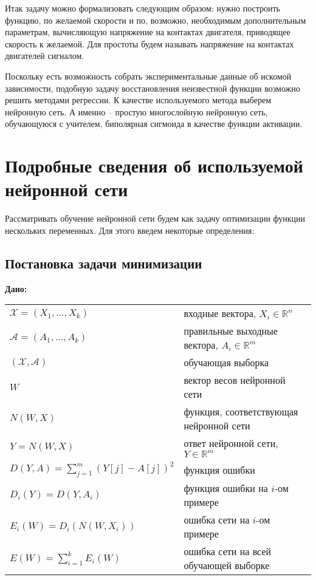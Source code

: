\documentclass[14pt]{extreport}
\begin{document}
        Итак задачу можно формализовать следующим образом: нужно построить функцию, по желаемой скорости и по, возможно, необходимым дополнительным параметрам, вычисляющую напряжение на контактах двигателя, приводящее скорость к желаемой. Для простоты будем называть напряжение на контактах двигателей сигналом.

        Поскольку есть возможность собрать экспериментальные данные об искомой зависимости, подобную задачу восстановления неизвестной функции возможно решить методами регрессии. К качестве используемого метода выберем нейронную сеть. А именно -- простую многослойную нейронную сеть, обучающуюся с учителем, биполярная сигмоида в качестве функции активации.
\newpage
    \chapter{Подробные сведения об используемой нейронной сети}

    Рассматривать обучение нейронной сети будем как задачу оптимизации функции нескольких переменных. Для этого введем некоторые определения:

    \section{Постановка задачи минимизации}

        {\bf 
            Дано:
        }

        \begin{tabular}{p{6cm} p{7.5cm}}
             $\mathcal{X}=(X_1,\ldots,X_k)$ & входные вектора, $X_i\in\mathbb{R}^n$\\[0.1cm]
             $\mathcal{A}=(A_1,\ldots,A_k)$ & правильные выходные вектора, $A_i\in\mathbb{R}^m$\\[0.1cm]
             $(\mathcal{X},\mathcal{A})$ & обучающая выборка  \\[0.1cm]
             $W$ & вектор весов нейронной сети \\[0.1cm]
             $N(W,X)$ & функция, соответствующая нейронной сети \\[0.1cm]
             $Y=N(W,X)$ & ответ нейронной сети, $Y\in\mathbb{R}^m$ \\[0.1cm]
             $D(Y,A) =\sum_{j=1}^{m} (Y[j]-A[j])^2$ & функция ошибки\\[0.1cm]
             $D_i(Y)=D(Y,A_i) $ & функция ошибки на $i$-ом примере \\[0.1cm]
              $E_i(W)=D_i(N(W,X_i))$ & ошибка сети на $i$-ом примере\\[0.1cm]
              $E(W)=\sum_{i=1}^{k}E_i(W) $ & ошибка сети на всей обучающей выборке \\[0.1cm]
         \end{tabular}
\end{document}
